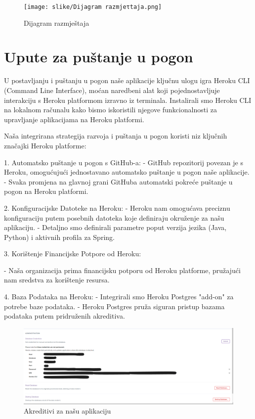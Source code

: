             \begin{figure}[H]
             \centering
             \texttt{[image: slike/Dijagram razmjeτtaja.png]}
             \caption{Dijagram razmještaja}
             \end{figure}
			\eject
		
		\section{Upute za puštanje u pogon}
		
		
U postavljanju i puštanju u pogon naše aplikacije ključnu ulogu igra Heroku CLI (Command Line Interface), moćan naredbeni alat koji pojednostavljuje interakciju s Heroku platformom izravno iz terminala. Instalirali smo Heroku CLI na lokalnom računalu kako bismo iskoristili njegove funkcionalnosti za upravljanje aplikacijama na Heroku platformi.

Naša integrirana strategija razvoja i puštanja u pogon koristi niz ključnih značajki Heroku platforme:

1. Automatsko puštanje u pogon s GitHub-a:
   - GitHub repozitorij povezan je s Heroku, omogućujući jednostavano automatsko puštanje u pogon naše aplikacije.
   - Svaka promjena na glavnoj grani GitHuba automatski pokreće puštanje u pogon na Heroku platformi.

2. Konfiguracijske Datoteke na Heroku:
   - Heroku nam omogućava preciznu konfiguraciju putem posebnih datoteka koje definiraju okruženje za našu aplikaciju.
   - Detaljno smo definirali parametre poput verzija jezika (Java, Python) i aktivnih profila za Spring.

3. Korištenje Financijske Potpore od Heroku:

   - Naša organizacija prima financijsku potporu od Heroku platforme, pružajući nam sredstva za korištenje resursa.


4. Baza Podataka na Heroku:
   - Integrirali smo Heroku Postgres "add-on" za potrebe baze podataka.
   - Heroku Postgres pruža siguran pristup bazama podataka putem pridruženih akreditiva.
   \begin{figure}[H]
       \centering
       \includegraphics[width=1\linewidth]{slike/credentials.png}
       \caption{Akreditivi za našu aplikaciju}
       \label{fig:enter-label}
   \end{figure}

